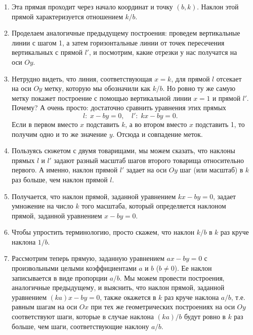 \begin{enumerate}
\begin{figure}[htb!]
\begin{center}
\end{center}
\caption{}\label{sectionkb}
\end{figure}
\item Эта прямая проходит через начало координат и точку $(b,k)$. Наклон этой прямой характеризуется отношением $k/b$.
\item Проделаем аналогичные предыдущему построения: проведем вертикальные линии с шагом 1, а затем горизонтальные линии от точек пересечения вертикальных с прямой $l'$, и посмотрим, какие отрезки у нас получатся на оси $Oy$.
\item Нетрудно видеть, что линия, соответствующая $x=k$, для прямой $l$ отсекает на оси $Oy$ метку, которую мы обозначили как $k/b$. Но ровно ту же самую метку покажет построение с помощью вертикальной линии $x=1$ и прямой $l'$. Почему? А очень просто: достаточно сравнить уравнения этих прямых
$$
l:\;x-by=0,\quad l':\;kx-by=0.
$$
Если в первом вместо $x$ подставить $k$, а во втором вместо $x$ подставить 1, то получим одно и то же значение $y$. Отсюда и совпадение меток.
\item Пользуясь сюжетом с двумя товарищами, мы можем сказать, что наклоны прямых $l$ и $l'$ задают разный масштаб шагов второго товарища относительно первого. А именно, наклон прямой $l'$ задает на оси $Oy$ шаг (или масштаб) в $k$ раз больше, чем наклон прямой $l$.

\item Получается, что наклон прямой, заданной уравнением $kx-by=0$, задает умножение на число $k$ того масштаба, который определяется наклоном прямой, заданной уравнением $x-by=0$.
\item Чтобы упростить терминологию, просто скажем, что наклон $k/b$ в $k$ раз круче наклона $1/b$.

\item Рассмотрим теперь прямую, заданную уравнением $ax-by=0$ с произвольными целыми коэффициентами $a$ и $b$ ($b\ne 0$). Ее наклон записывается в виде пропорции $a/b$. Мы можем провести построения, аналогичные предыдущему, и выяснить, что наклон прямой, заданной уравнением $(ka)x-by=0$, также окажется в $k$ раз круче наклона $a/b$, т.е. равным шагам на оси $Ox$ при тех же геометрических построениях на оси $Oy$ соответствуют шаги, которые в случае наклона $(ka)/b$ будут ровно в $k$ раз больше, чем шаги, соответствующие наклону $a/b$.


\end{enumerate}
